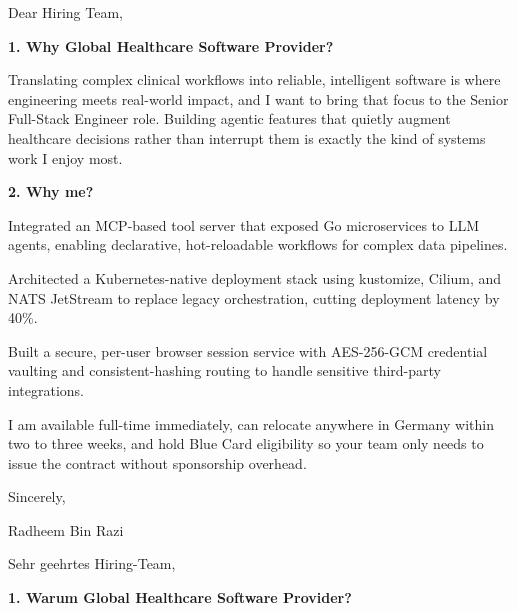 \documentclass[11pt,a4paper]{coverletter}
\begin{document}

\opening{Dear Hiring Team,}

\vspace{8pt}\noindent\textbf{1. Why Global Healthcare Software Provider?}\par\vspace{3pt}

Translating complex clinical workflows into reliable, intelligent software is where engineering meets real-world impact, and I want to bring that focus to the Senior Full-Stack Engineer role. Building agentic features that quietly augment healthcare decisions rather than interrupt them is exactly the kind of systems work I enjoy most.

\vspace{8pt}\noindent\textbf{2. Why me?}\par\vspace{3pt}

\bullets

  \item Integrated an MCP-based tool server that exposed Go microservices to LLM agents, enabling declarative, hot-reloadable workflows for complex data pipelines.

  \item Architected a Kubernetes-native deployment stack using kustomize, Cilium, and NATS JetStream to replace legacy orchestration, cutting deployment latency by 40\%.

  \item Built a secure, per-user browser session service with AES-256-GCM credential vaulting and consistent-hashing routing to handle sensitive third-party integrations.

\bulletsend

I am available full-time immediately, can relocate anywhere in Germany within two to three weeks, and hold Blue Card eligibility so your team only needs to issue the contract without sponsorship overhead.

\closing{Sincerely,}{Radheem Bin Razi}

\clearpage
{}


\opening{Sehr geehrtes Hiring-Team,}

\vspace{8pt}\noindent\textbf{1. Warum Global Healthcare Software Provider?}\par\vspace{3pt}
\end{document}
